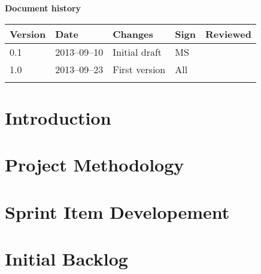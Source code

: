 \documentclass[10pt, a4paper, twoside]{article}
\numberwithin{equation}{subsection}
\numberwithin{figure}{section}
\numberwithin{table}{section}
\begin{document}



\newpage
\pagestyle{fancy}
\setcounter{page}{2} %




\newpage
\tableofcontents
\listoffigures


\newpage
\vspace*{5\baselineskip}

\begin{center}
\textbf{\LARGE Document history}

{ \footnotesize 
\begin{tabular}{|p{1cm}|p{2.0cm}|p{5cm}|p{1.5cm}|p{2cm}|}
	\hline
	\textbf{Version} & \textbf{Date} & \textbf{Changes} & \textbf{Sign} & \textbf{Reviewed} \\
	
	\hline
	0.1 & 2013--09--10 & Initial draft & MS & \\
	\hline
	1.0 & 2013--09--23 & First version & All & \\
	
	\hline
	 &  &  &  &  \\
	
	\hline
\end{tabular}
}
\end{center}



%
%
\newpage
{}


\newpage
\section{Introduction}
\label{sec:introduction}


\newpage
\section{Project Methodology}
\label{sec:project_methodology}


\newpage
\section{Sprint Item Developement}
\label{sec:sprint_item_developement}


\newpage
\section{Initial Backlog}
\label{sec:initial_backlog}




%
%

\thispagestyle{fancy}
\mbox{}
\newpage

\end{document}
